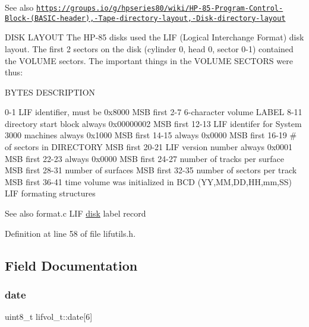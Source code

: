 \begin{DoxySeeAlso}{See also}
\href{https://groups.io/g/hpseries80/wiki/HP-85-Program-Control-Block-(BASIC-header),-Tape-directory-layout,-Disk-directory-layout}{\tt https\+://groups.\+io/g/hpseries80/wiki/\+H\+P-\/85-\/\+Program-\/\+Control-\/\+Block-\/(\+B\+A\+S\+I\+C-\/header),-\/\+Tape-\/directory-\/layout,-\/\+Disk-\/directory-\/layout}
\end{DoxySeeAlso}
D\+I\+SK L\+A\+Y\+O\+UT The H\+P-\/85 disks used the L\+IF (Logical Interchange Format) disk layout. The first 2 sectors on the disk (cylinder 0, head 0, sector 0-\/1) contained the V\+O\+L\+U\+ME sectors. The important things in the V\+O\+L\+U\+ME S\+E\+C\+T\+O\+RS were thus\+:

B\+Y\+T\+ES D\+E\+S\+C\+R\+I\+P\+T\+I\+ON 

 0-\/1 L\+IF identifier, must be 0x8000 M\+SB first 2-\/7 6-\/character volume L\+A\+B\+EL 8-\/11 directory start block always 0x00000002 M\+SB first 12-\/13 L\+IF identifer for System 3000 machines always 0x1000 M\+SB first 14-\/15 always 0x0000 M\+SB first 16-\/19 \# of sectors in D\+I\+R\+E\+C\+T\+O\+RY M\+SB first 20-\/21 L\+IF version number always 0x0001 M\+SB first 22-\/23 always 0x0000 M\+SB first 24-\/27 number of tracks per surface M\+SB first 28-\/31 number of surfaces M\+SB first 32-\/35 number of sectors per track M\+SB first 36-\/41 time volume was initialized in B\+CD (YY,MM,DD,HH,mm,SS) L\+IF formating structures \begin{DoxySeeAlso}{See also}
format.\+c L\+IF \hyperlink{td02lif_8c_affcceda12b139f26819f4929be705eb1}{disk} label record 
\end{DoxySeeAlso}


Definition at line 58 of file lifutils.\+h.



\subsection{Field Documentation}
\mbox{\label{structlifvol__t_a41f630e7211326270dc6e72a55f94516}} 
\subsubsection{\texorpdfstring{date}{date}}
{\footnotesize\ttfamily uint8\+\_\+t lifvol\+\_\+t\+::date\mbox{[}6\mbox{]}}



